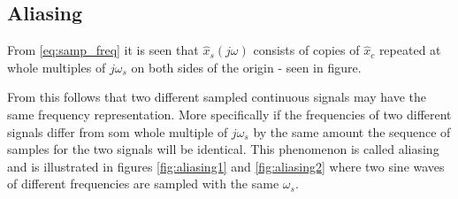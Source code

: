 \subsection{Aliasing}\label{sec:aliasing}
From \eqref{eq:samp_freq} it is seen that $\hat{x}_s(j\omega)$ consists of copies of $\hat{x}_c$ repeated at whole multiples of $j\omega_s$ on both sides of the origin - seen in figure.
\begin{figure}
\centering
{}
\end{figure}
From this follows that two different sampled continuous signals may have the same frequency representation. More specifically if the frequencies of two different signals differ from som whole multiple of $j\omega_s$ by the same amount the sequence of samples for the two signals will be identical. \cite{pelgrom} This phenomenon is called aliasing and is illustrated in figures \ref{fig:aliasing1} and \ref{fig:aliasing2} where two sine waves of different frequencies are sampled with the same $\omega_s$.
